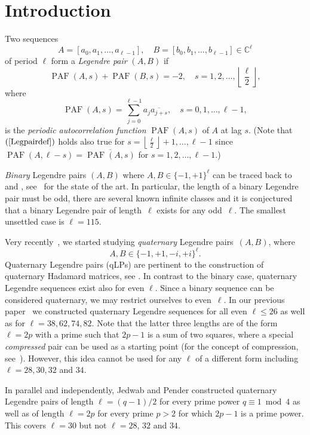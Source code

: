 \documentclass{article}
\theoremstyle{definition}
\newcommand{\PAF}{\operatorname{PAF}}
\begin{document}
\section{Introduction}

Two sequences 
$$A=[a_0,a_1,\ldots,a_{\ell-1}],\quad B=[b_0,b_1,\ldots,b_{\ell-1}]\in \mathbb{C}^\ell
$$ 
of period $\ell$ form a {\em Legendre pair} $(A,B)$ if
\begin{equation}\label{Legpairdef}\PAF(A,s)+\PAF(B,s)=-2,\quad s=1,2,\ldots,\left\lfloor\frac{\ell}{2}\right\rfloor,
\end{equation}
where 
$$\PAF(A,s)=\sum_{j=0}^{\ell-1} a_j\overline{a_{j+s}},\quad s=0,1,\ldots,\ell-1,$$
is the {\em periodic autocorrelation function} $\PAF(A,s)$ of $A$ at lag $s$.
(Note that $(\ref{Legpairdef})$ holds also true for $s=\left\lfloor\frac{\ell}{2}\right\rfloor+1,\ldots,\ell-1$
since $\PAF(A,\ell-s)=\overline{\PAF(A,s)}$ for $s=1,2,\ldots,\ell-1$.)


{\em Binary} Legendre pairs $(A,B)$ where $A,B \in \{-1,+1\}^{\ell}$ can be traced back to~\cite{fgs01} and \cite{s69}, see~\cite{kkbatr23,kw24} for the state of the art. In particular, the length of a binary Legendre pair must be odd, there are several known infinite classes and it is conjectured that a binary Legendre pair of length~$\ell$ exists for any odd~$\ell$. The smallest unsettled case is $\ell=115$.

Very recently~\cite{kw24}, we started studying {\em quaternary} Legendre pairs~$(A,B)$, where
$$A,B\in \{-1,+1,-i,+i\}^\ell.$$
Quaternary Legendre pairs (qLPs) are pertinent to the construction of quaternary Hadamard matrices, see \cite[Theorem~2.2]{kw24}.
In contrast to the binary case, quaternary Legendre sequences exist also for even $\ell$. %
Since a binary sequence can be considered quaternary, we may restrict ourselves to even~$\ell$.
In our previous paper~\cite{kw24} we constructed quaternary Legendre sequences for all even $\ell\le 26$ as well as for $\ell=38,62,74,82$. Note that the latter three lengths are of the form
$\ell=2p$ with a prime such that $2p-1$ is a sum of two squares, where a special \emph{compressed} pair can be used as a starting point (for the concept of compression, see~\cite{kw24}). However, this idea cannot be used for any $\ell$ of a different form including $\ell=28,30,32$ and $34$.

In parallel and independently, Jedwab and Pender \cite{jp24} constructed quaternary Legendre pairs of length $\ell=(q-1)/2$ for every prime power $q\equiv 1\bmod 4$ as well as of length $\ell=2p$ for every prime $p>2$ for which $2p-1$ is a prime power. This covers $\ell=30$ but not $\ell=28$, $32$ and $34$.
\end{document}
